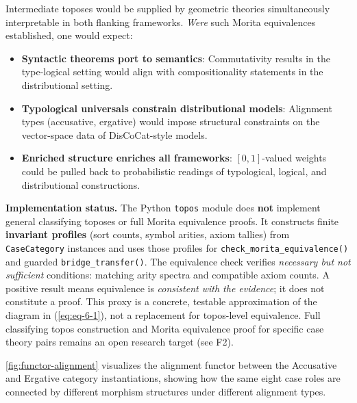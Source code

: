 \documentclass[
]{article}
\providecommand{\tightlist}{%
  \setlength{\itemsep}{0pt}\setlength{\parskip}{0pt}}
\begin{document}
Intermediate toposes would be supplied by geometric theories
simultaneously interpretable in both flanking frameworks. \emph{Were}
such Morita equivalences established, one would expect:

\begin{itemize}
\tightlist
\item
  \textbf{Syntactic theorems port to semantics}: Commutativity results
  in the type-logical setting would align with compositionality
  statements in the distributional setting.
\item
  \textbf{Typological universals constrain distributional models}:
  Alignment types (accusative, ergative) would impose structural
  constraints on the vector-space data of DisCoCat-style models.
\item
  \textbf{Enriched structure enriches all frameworks}: \([0,1]\)-valued
  weights could be pulled back to probabilistic readings of typological,
  logical, and distributional constructions.
\end{itemize}

\textbf{Implementation status.} The Python \texttt{topos} module does
\textbf{not} implement general classifying toposes or full Morita
equivalence proofs. It constructs finite \textbf{invariant profiles}
(sort counts, symbol arities, axiom tallies) from \texttt{CaseCategory}
instances and uses those profiles for
\texttt{check\_morita\_equivalence()} and guarded
\texttt{bridge\_transfer()}. The equivalence check verifies
\emph{necessary but not sufficient} conditions: matching arity spectra
and compatible axiom counts. A positive result means equivalence is
\emph{consistent with the evidence}; it does not constitute a proof.
This proxy is a concrete, testable approximation of the diagram in
(\ref{eq:eq-6-1}), not a replacement for topos-level equivalence. Full
classifying topos construction and Morita equivalence proof for specific
case theory pairs remains an open research target (see F2).

\autoref{fig:functor-alignment} visualizes the alignment functor between
the Accusative and Ergative category instantiations, showing how the
same eight case roles are connected by different morphism structures
under different alignment types.
\end{document}
